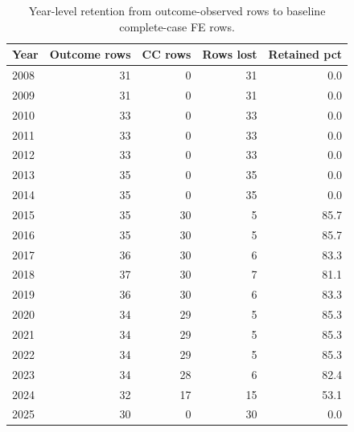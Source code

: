 \begin{table}[htbp]
\centering
\small
\caption{Year-level retention from outcome-observed rows to baseline complete-case FE rows.}
\label{tab:attrition_by_year}
\begin{tabular}{@{}lrrrr@{}}
\toprule
Year & Outcome rows & CC rows & Rows lost & Retained pct \\
\midrule
2008 & 31 & 0 & 31 & 0.0 \\
2009 & 31 & 0 & 31 & 0.0 \\
2010 & 33 & 0 & 33 & 0.0 \\
2011 & 33 & 0 & 33 & 0.0 \\
2012 & 33 & 0 & 33 & 0.0 \\
2013 & 35 & 0 & 35 & 0.0 \\
2014 & 35 & 0 & 35 & 0.0 \\
2015 & 35 & 30 & 5 & 85.7 \\
2016 & 35 & 30 & 5 & 85.7 \\
2017 & 36 & 30 & 6 & 83.3 \\
2018 & 37 & 30 & 7 & 81.1 \\
2019 & 36 & 30 & 6 & 83.3 \\
2020 & 34 & 29 & 5 & 85.3 \\
2021 & 34 & 29 & 5 & 85.3 \\
2022 & 34 & 29 & 5 & 85.3 \\
2023 & 34 & 28 & 6 & 82.4 \\
2024 & 32 & 17 & 15 & 53.1 \\
2025 & 30 & 0 & 30 & 0.0 \\
\bottomrule
\end{tabular}
\end{table}
